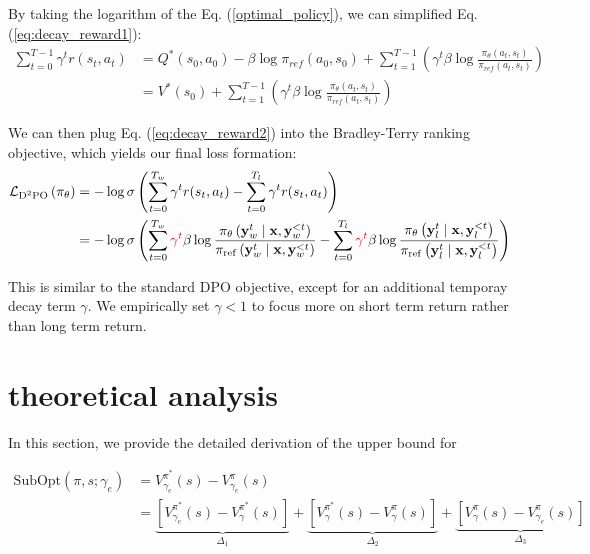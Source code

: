 By taking the logarithm of the Eq. (\ref{optimal_policy}), we can simplified Eq. (\ref{eq:decay_reward1}):
\begin{align}
\sum\limits_{t=0}^{T-1}\gamma^tr(s_t, a_t)
&=Q^*(s_0, a_0) - \beta \log \pi_{ref}(a_0, s_0) + \sum\limits_{t=1}^{T-1}(\gamma^t\beta \log \frac{\pi_{\theta}(a_t, s_t)}{\pi_{ref}(a_t,s_t)}) \\
&=V^*(s_0) + \sum\limits_{t=1}^{T-1}(\gamma^t\beta \log \frac{\pi_{\theta}(a_t, s_t)}{\pi_{ref}(a_t,s_t)})\label{eq:decay_reward2}
\end{align}

We can then plug Eq. (\ref{eq:decay_reward2}) into the Bradley-Terry ranking objective, which yields our final loss formation:
\begin{align}
\mathcal{L}_{\textrm{D}^2\textrm{PO}}\left(\pi_\theta\right)
    &= -\log \sigma\left(\sum\limits_{t=0}^{T_w} \gamma^tr(s_t, a_t) - \sum\limits_{t=0}^{T_l} \gamma^tr(s_t, a_t)\right) \\
    &=-\log \sigma\left(\sum\limits_{t=0}^{T_w} \textcolor{red}{\gamma^t} \beta \log \frac{\pi_\theta\left(\mathbf{y}_w^t \mid \mathbf{x},\mathbf{y}_w^{<t}\right)}{\pi_{\mathrm{ref}}\left(\mathbf{y}_w^t \mid \mathbf{x},\mathbf{y}_w^{<t}\right)}-\sum\limits_{t=0}^{T_l} \textcolor{red}{\gamma^t} \beta \log \frac{\pi_\theta\left(\mathbf{y}_l^t \mid \mathbf{x},\mathbf{y}_l^{<t}\right)}{\pi_{\mathrm{ref}}\left(\mathbf{y}_l^t \mid \mathbf{x},\mathbf{y}_l^{<t}\right)}\right)
\end{align}

This is similar to the standard DPO objective, except for an additional temporay decay term $\gamma$. We empirically set $\gamma < 1$ to focus more on short term return rather than long term return.

\clearpage
\newpage

\section{theoretical analysis}
\label{sec:theorem_proof}
In this section, we provide the detailed derivation of the upper bound for

\begin{equation}
\begin{aligned}
\text{SubOpt}(\pi, s; \gamma_e) &= V_{\gamma_e}^{\pi^*}(s) - V_{\gamma_e}^{\pi}(s) \\
&= \underbrace{\left[V_{\gamma_e}^{\pi^*}(s) - V_{\gamma}^{\pi^*}(s)\right]}_{\Delta_1} + \underbrace{\left[V_{\gamma}^{\pi^*}(s) - V_{\gamma}^{\pi}(s)\right]}_{\Delta_2} + \underbrace{\left[V_{\gamma}^{\pi}(s) - V_{\gamma_e}^{\pi}(s)\right]}_{\Delta_3}
\end{aligned}
\end{equation}

